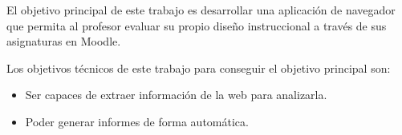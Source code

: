 
El objetivo principal de este trabajo es desarrollar una aplicación de navegador
que permita al profesor evaluar su propio diseño instruccional a través de sus asignaturas en Moodle.

Los objetivos técnicos de este trabajo para conseguir el objetivo principal son:
\begin{itemize}
	\item Ser capaces de extraer información de la web para analizarla.
	\item Poder generar informes de forma automática.
\end{itemize}
